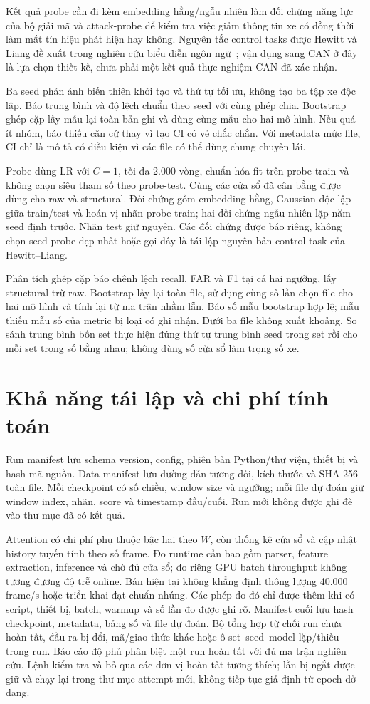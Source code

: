 \documentclass[12pt,a4paper,oneside,openany]{extbook}
\DeclareRobustCommand{\code}[1]{\texttt{\detokenize{#1}}}
\begin{document}
Kết quả probe cần đi kèm embedding hằng/ngẫu nhiên làm đối chứng năng lực của bộ giải mã và attack-probe để kiểm tra việc giảm thông tin xe có đồng thời làm mất tín hiệu phát hiện hay không. Nguyên tắc control tasks được Hewitt và Liang đề xuất trong nghiên cứu biểu diễn ngôn ngữ~\cite{hewitt2019probes}; vận dụng sang CAN ở đây là lựa chọn thiết kế, chưa phải một kết quả thực nghiệm CAN đã xác nhận.

Ba seed phản ánh biến thiên khởi tạo và thứ tự tối ưu, không tạo ba tập xe độc lập. Báo trung bình và độ lệch chuẩn theo seed với cùng phép chia. Bootstrap ghép cặp lấy mẫu lại toàn bản ghi và dùng cùng mẫu cho hai mô hình. Nếu quá ít nhóm, báo thiếu căn cứ thay vì tạo CI có vẻ chắc chắn. Với metadata mức file, CI chỉ là mô tả có điều kiện vì các file có thể dùng chung chuyến lái.

Probe dùng LR với $C=1$, tối đa 2.000 vòng, chuẩn hóa fit trên probe-train và không chọn siêu tham số theo probe-test. Cùng các cửa sổ đã cân bằng được dùng cho raw và structural. Đối chứng gồm embedding hằng, Gaussian độc lập giữa train/test và hoán vị nhãn probe-train; hai đối chứng ngẫu nhiên lặp năm seed định trước. Nhãn test giữ nguyên. Các đối chứng được báo riêng, không chọn seed probe đẹp nhất hoặc gọi đây là tái lập nguyên bản control task của Hewitt--Liang.

Phân tích ghép cặp báo chênh lệch recall, FAR và F1 tại cả hai ngưỡng, lấy structural trừ raw. Bootstrap lấy lại toàn file, sử dụng cùng số lần chọn file cho hai mô hình và tính lại từ ma trận nhầm lẫn. Báo số mẫu bootstrap hợp lệ; mẫu thiếu mẫu số của metric bị loại có ghi nhận. Dưới ba file không xuất khoảng. So sánh trung bình bốn set thực hiện đúng thứ tự trung bình seed trong set rồi cho mỗi set trọng số bằng nhau; không dùng số cửa sổ làm trọng số xe.

\section{Khả năng tái lập và chi phí tính toán}
Run manifest lưu schema version, config, phiên bản Python/thư viện, thiết bị và hash mã nguồn. Data manifest lưu đường dẫn tương đối, kích thước và SHA-256 toàn file. Mỗi checkpoint có số chiều, window size và ngưỡng; mỗi file dự đoán giữ window index, nhãn, score và timestamp đầu/cuối. Run mới không được ghi đè vào thư mục đã có kết quả.

Attention có chi phí phụ thuộc bậc hai theo $W$, còn thống kê cửa sổ và cập nhật history tuyến tính theo số frame. Đo runtime cần bao gồm parser, feature extraction, inference và chờ đủ cửa sổ; đo riêng GPU batch throughput không tương đương độ trễ online. Bản hiện tại không khẳng định thông lượng 40.000 frame/s hoặc triển khai đạt chuẩn nhúng. Các phép đo đó chỉ được thêm khi có script, thiết bị, batch, warmup và số lần đo được ghi rõ.
Manifest cuối lưu hash checkpoint, metadata, bảng số và file dự đoán. Bộ tổng hợp từ chối run chưa hoàn tất, đầu ra bị đổi, mã/giao thức khác hoặc ô set--seed--model lặp/thiếu trong run. Báo cáo độ phủ phân biệt một run hoàn tất với đủ ma trận nghiên cứu. Lệnh \code{run_study.py} kiểm tra và bỏ qua các đơn vị hoàn tất tương thích; lần bị ngắt được giữ và chạy lại trong thư mục attempt mới, không tiếp tục giả định từ epoch dở dang.
\end{document}
